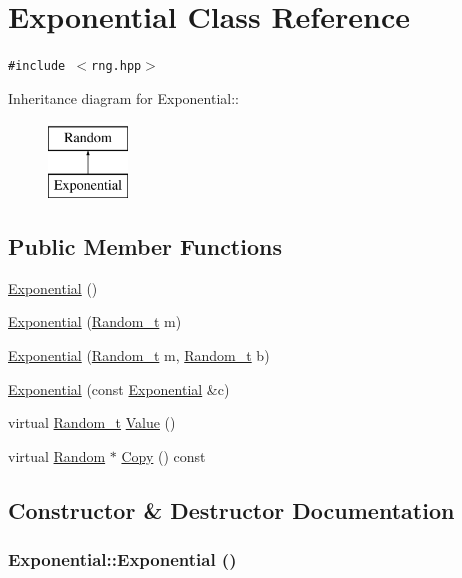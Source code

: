 \hypertarget{classExponential}{
\section{Exponential Class Reference}
\label{classExponential}
}
{\tt \#include $<$rng.hpp$>$}

Inheritance diagram for Exponential::\begin{figure}[H]
\begin{center}
\leavevmode
\includegraphics[height=2cm]{classExponential}
\end{center}
\end{figure}
\subsection*{Public Member Functions}
\begin{CompactItemize}
\item 
\hyperlink{classExponential_bc75eaef5b5f89656c4aa406aceb3c27}{Exponential} ()
\item 
\hyperlink{classExponential_62d588bfc48c87b4cf30badcd306cfa3}{Exponential} (\hyperlink{rng_8hpp_ad41e7f5d86b1109b6a6a032c86cdd3f}{Random\_\-t} m)
\item 
\hyperlink{classExponential_469f22991fc0e7192e395ffde9b6a1ce}{Exponential} (\hyperlink{rng_8hpp_ad41e7f5d86b1109b6a6a032c86cdd3f}{Random\_\-t} m, \hyperlink{rng_8hpp_ad41e7f5d86b1109b6a6a032c86cdd3f}{Random\_\-t} b)
\item 
\hyperlink{classExponential_5b49e6e7f936a44f88a54aa3ff5e6e61}{Exponential} (const \hyperlink{classExponential}{Exponential} \&c)
\item 
virtual \hyperlink{rng_8hpp_ad41e7f5d86b1109b6a6a032c86cdd3f}{Random\_\-t} \hyperlink{classExponential_c2ad56e3dc3e65673cb54cab95d34a53}{Value} ()
\item 
virtual \hyperlink{classRandom}{Random} $\ast$ \hyperlink{classExponential_f7c51eb8cb4fee14f659a55f994e981f}{Copy} () const 
\end{CompactItemize}


\subsection{Constructor \& Destructor Documentation}
\hypertarget{classExponential_bc75eaef5b5f89656c4aa406aceb3c27}{
\subsubsection[{Exponential}]{\setlength{\rightskip}{0pt plus 5cm}Exponential::Exponential ()}}
\label{classExponential_bc75eaef5b5f89656c4aa406aceb3c27}


